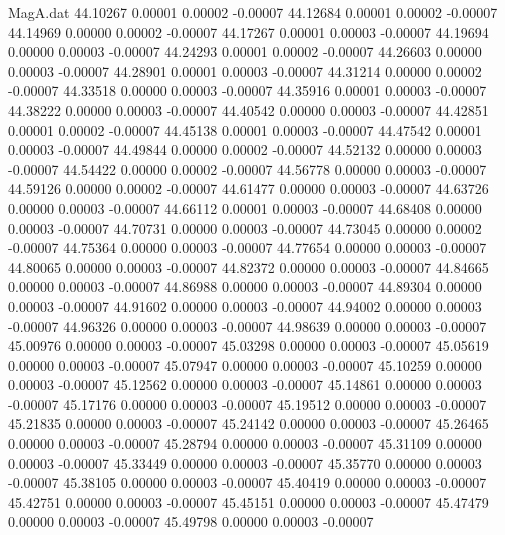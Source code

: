 \begin{filecontents}{MagA.dat}
  44.10267    0.00001    0.00002   -0.00007
  44.12684    0.00001    0.00002   -0.00007
  44.14969    0.00000    0.00002   -0.00007
  44.17267    0.00001    0.00003   -0.00007
  44.19694    0.00000    0.00003   -0.00007
  44.24293    0.00001    0.00002   -0.00007
  44.26603    0.00000    0.00003   -0.00007
  44.28901    0.00001    0.00003   -0.00007
  44.31214    0.00000    0.00002   -0.00007
  44.33518    0.00000    0.00003   -0.00007
  44.35916    0.00001    0.00003   -0.00007
  44.38222    0.00000    0.00003   -0.00007
  44.40542    0.00000    0.00003   -0.00007
  44.42851    0.00001    0.00002   -0.00007
  44.45138    0.00001    0.00003   -0.00007
  44.47542    0.00001    0.00003   -0.00007
  44.49844    0.00000    0.00002   -0.00007
  44.52132    0.00000    0.00003   -0.00007
  44.54422    0.00000    0.00002   -0.00007
  44.56778    0.00000    0.00003   -0.00007
  44.59126    0.00000    0.00002   -0.00007
  44.61477    0.00000    0.00003   -0.00007
  44.63726    0.00000    0.00003   -0.00007
  44.66112    0.00001    0.00003   -0.00007
  44.68408    0.00000    0.00003   -0.00007
  44.70731    0.00000    0.00003   -0.00007
  44.73045    0.00000    0.00002   -0.00007
  44.75364    0.00000    0.00003   -0.00007
  44.77654    0.00000    0.00003   -0.00007
  44.80065    0.00000    0.00003   -0.00007
  44.82372    0.00000    0.00003   -0.00007
  44.84665    0.00000    0.00003   -0.00007
  44.86988    0.00000    0.00003   -0.00007
  44.89304    0.00000    0.00003   -0.00007
  44.91602    0.00000    0.00003   -0.00007
  44.94002    0.00000    0.00003   -0.00007
  44.96326    0.00000    0.00003   -0.00007
  44.98639    0.00000    0.00003   -0.00007
  45.00976    0.00000    0.00003   -0.00007
  45.03298    0.00000    0.00003   -0.00007
  45.05619    0.00000    0.00003   -0.00007
  45.07947    0.00000    0.00003   -0.00007
  45.10259    0.00000    0.00003   -0.00007
  45.12562    0.00000    0.00003   -0.00007
  45.14861    0.00000    0.00003   -0.00007
  45.17176    0.00000    0.00003   -0.00007
  45.19512    0.00000    0.00003   -0.00007
  45.21835    0.00000    0.00003   -0.00007
  45.24142    0.00000    0.00003   -0.00007
  45.26465    0.00000    0.00003   -0.00007
  45.28794    0.00000    0.00003   -0.00007
  45.31109    0.00000    0.00003   -0.00007
  45.33449    0.00000    0.00003   -0.00007
  45.35770    0.00000    0.00003   -0.00007
  45.38105    0.00000    0.00003   -0.00007
  45.40419    0.00000    0.00003   -0.00007
  45.42751    0.00000    0.00003   -0.00007
  45.45151    0.00000    0.00003   -0.00007
  45.47479    0.00000    0.00003   -0.00007
  45.49798    0.00000    0.00003   -0.00007

\end{filecontents}
